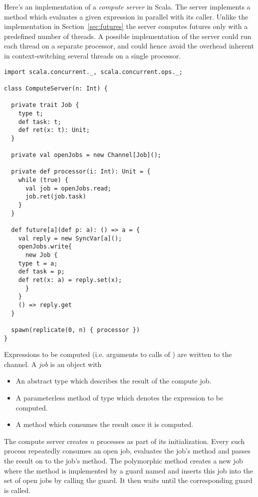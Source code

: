 \documentclass[a4paper,12pt,twoside,titlepage]{book}
\begin{document}
{Here's an implementation of a {\em compute server} in Scala. The
server implements a  method which evaluates a given
expression in parallel with its caller. Unlike the implementation in
Section~\ref{sec:futures} the server computes futures only with a
predefined number of threads. A possible implementation of the server
could run each thread on a separate processor, and could hence avoid
the overhead inherent in context-switching several threads on a single
processor.

\begin{lstlisting}
import scala.concurrent._, scala.concurrent.ops._;

class ComputeServer(n: Int) {

  private trait Job {
    type t;
    def task: t;
    def ret(x: t): Unit;
  }

  private val openJobs = new Channel[Job]();

  private def processor(i: Int): Unit = {
    while (true) {
      val job = openJobs.read;
      job.ret(job.task) 
    }
  }

  def future[a](def p: a): () => a = {
    val reply = new SyncVar[a]();
    openJobs.write{
      new Job { 
	type t = a;
	def task = p;
	def ret(x: a) = reply.set(x);
      }
    }
    () => reply.get
  }

  spawn(replicate(0, n) { processor })
}
\end{lstlisting}
Expressions to be computed (i.e. arguments
to calls of ) are written to the 
channel. A {\em job} is an object with
\begin{itemize}
\item
An abstract type  which describes the result of the compute
job.
\item
A parameterless  method of type  which denotes
the expression to be computed.
\item
A  method which consumes the result once it is
computed.
\end{itemize}
The compute server creates $n$  processes as part of
its initialization.  Every such process repeatedly consumes an open
job, evaluates the job's  method and passes the result on
to the job's
 method. The polymorphic  method creates
a new job where the  method is implemented by a guard
named  and inserts this job into the set of open jobs by
calling the  guard. It then waits until the corresponding
 guard is called.

}
\end{document}
